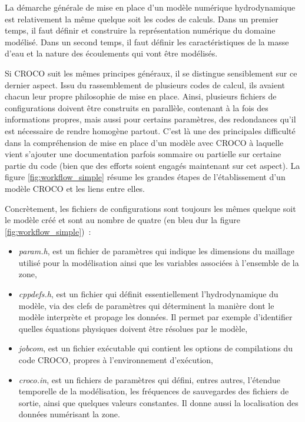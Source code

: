 \documentclass[10pt,a4paper,titlepage]{article}
\begin{document}
    La démarche générale de mise en place d'un modèle numérique hydrodynamique est relativement la même quelque soit les codes de calculs. Dans un premier temps, il faut définir et construire la représentation numérique du domaine modélisé. Dans un second temps, il faut définir les caractéristiques de la masse d'eau et la nature des écoulements qui vont être modélisés.
    
    Si CROCO suit les mêmes principes généraux, il se distingue sensiblement sur ce dernier aspect. Issu du rassemblement de plusieurs codes de calcul, ils avaient chacun leur propre philosophie de mise en place.  Ainsi, plusieurs fichiers de configurations doivent être construits en parallèle, contenant à la fois des informations propres, mais aussi pour certains paramètres, des redondances qu'il est nécessaire de rendre homogène partout. C'est là une des principales difficulté dans la compréhension de mise en place d'un modèle avec CROCO à laquelle vient s'ajouter une documentation parfois sommaire ou partielle sur certaine partie du code (bien que des efforts soient engagés maintenant sur cet aspect). La figure \ref{fig:workflow_simple} résume les grandes étapes de l'établissement d'un modèle CROCO et les liens entre elles.
    
    Concrètement, les fichiers de configurations sont toujours les mêmes quelque soit le modèle créé et sont au nombre de quatre (en bleu dur la figure \ref{fig:workflow_simple})~:
    \begin{itemize}
        \item \textit{param.h}, est un fichier de paramètres qui indique les dimensions du maillage utilisé pour la modélisation ainsi que les variables associées à l'ensemble de la zone,
        \item \textit{cppdefs.h}, est un fichier qui définit essentiellement l'hydrodynamique du modèle, via des clefs de paramètres qui déterminent la manière dont le modèle interprète et propage les données. Il permet par exemple d'identifier quelles équations physiques doivent être résolues par le modèle,
        \item \textit{jobcom}, est un fichier exécutable qui contient les options de compilations du code CROCO, propres à l'environnement d’exécution,
        \item \textit{croco.in}, est un fichiers de paramètres qui défini, entres autres, l'étendue temporelle de la modélisation, les fréquences de sauvegardes des fichiers de sortie, ainsi que quelques valeurs constantes. Il donne aussi la localisation des données numérisant la zone.
    \end{itemize}
    
\end{document}
